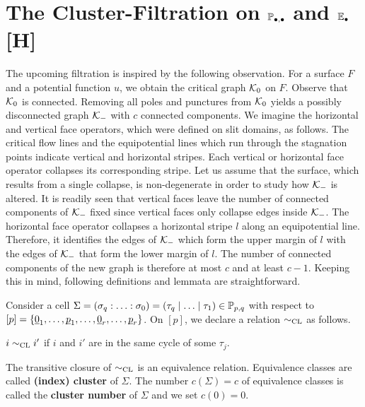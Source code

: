 \section{The Cluster-Filtration on \texorpdfstring{$\mathbb P_{\bullet, \bullet}$}{P} and \texorpdfstring{$\mathbb E_\bullet$}{E} [H]}
The upcoming filtration is inspired by the following observation.
For a surface $F$ and a potential function $u$, we obtain the critical graph $\mathcal{K}_0$ on $F$.
Observe that $\mathcal{K}_0$ is connected.
Removing all poles and punctures from $\mathcal{K}_0$ yields a possibly disconnected graph $\mathcal{K}_-$ with $c$ connected components.
We imagine the horizontal and vertical face operators, which were defined on slit domains, as follows.
The critical flow lines and the equipotential lines which run through the stagnation points indicate vertical and horizontal stripes.
Each vertical or horizontal face operator collapses its corresponding stripe.
Let us assume that the surface, which results from a single collapse, is non-degenerate in order to study how $\mathcal{K}_-$ is altered.
It is readily seen that vertical faces leave the number of connected components of $\mathcal{K}_-$ fixed since vertical faces only collapse edges inside $\mathcal{K}_-$.
The horizontal face operator collapses a horizontal stripe $l$ along an equipotential line.
Therefore, it identifies the edges of $\mathcal{K}_-$ which form the upper margin of $l$ with the edges of $\mathcal{K}_-$ that form the lower margin of $l$.
The number of connected components of the new graph is therefore at most $c$ and at least $c-1$.
Keeping this in mind, following definitions and lemmata are straightforward.
\begin{defi}
    \label{css:cluster_relation}
    Consider a cell $ \Sigma = \homogq = \inhomq \in \PP_{p,q}$ with respect to $[p] = \{ \ul0_1, \ldots, \ul p_1, \ldots, \ul 0_r, \ldots, \ul p_r\}$. 
    On $[p]$, we declare a relation $\sim_{\mathrm{CL}}$ as follows.
    \begin{center}
        $i \sim_{\mathrm{CL}} i'$ \hspace{10pt} if \hspace{10pt} $i$ and $i'$ are in the same cycle of some $\tau_j$. 
    \end{center}
    The transitive closure of $\sim_{\mathrm{CL}}$ is an equivalence relation.
    Equivalence classes are called {\bf (index) cluster} of $\Sigma$.
    The number $c(\Sigma) = c$ of equivalence classes is called the {\bf cluster number} of $\Sigma$ and we set $c(0) = 0$. 
\end{defi}

